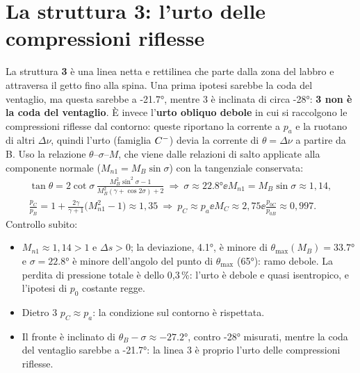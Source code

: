 \section*{La struttura 3: l'urto delle compressioni riflesse}
La struttura \textbf{3} è una linea netta e rettilinea che parte dalla zona del labbro e attraversa il getto fino alla
spina. Una prima ipotesi sarebbe la coda del ventaglio, ma questa sarebbe a \ang{-21.7}, mentre 3 è inclinata di circa
\ang{-28}: \textbf{3 non è la coda del ventaglio}. È invece l'\textbf{urto obliquo debole} in cui si raccolgono le
compressioni riflesse dal contorno: queste riportano la corrente a $p_a$ e la ruotano di altri $\Delta\nu$, quindi l'urto
(famiglia $C^{-}$) devia la corrente di $\theta=\Delta\nu$ a partire da B. Uso la relazione $\theta$--$\sigma$--$M$, che
viene dalle relazioni di salto applicate alla componente normale ($M_{n1}=M_B\sin\sigma$) con la tangenziale
conservata:
\begin{gather*}
\tan\theta=2\cot\sigma\,\frac{M_B^2\sin^2\sigma-1}{M_B^2(\gamma+\cos2\sigma)+2}
\ \Rightarrow\ \sigma\approx\ang{22.8} \ee M_{n1}=M_B\sin\sigma\approx1{,}14,\\
\frac{p_C}{p_B}=1+\frac{2\gamma}{\gamma+1}\big(M_{n1}^2-1\big)\approx1{,}35
\ \Rightarrow\ p_C\approx p_a \ee M_C\approx2{,}75 \ee \frac{p_{0C}}{p_{0B}}\approx0{,}997 .
\end{gather*}
Controllo subito:
\begin{itemize}
\item $M_{n1}\approx1{,}14>1$ e $\Delta s>0$; la deviazione, \ang{4.1}, è minore di $\theta_{\max}(M_B)=\ang{33.7}$ e
  $\sigma=\ang{22.8}$ è minore dell'angolo del punto di $\theta_{\max}$ (\ang{65}): ramo debole. La perdita di
  pressione totale è dello 0,3\,\%: l'urto è debole e quasi isentropico, e l'ipotesi di $p_0$ costante regge.
\item Dietro 3 $p_C\approx p_a$: la condizione sul contorno è rispettata.
\item Il fronte è inclinato di $\theta_B-\sigma\approx\ang{-27.2}$, contro \ang{-28} misurati, mentre la coda del
  ventaglio sarebbe a \ang{-21.7}: la linea 3 è proprio l'urto delle compressioni riflesse.
\end{itemize}

